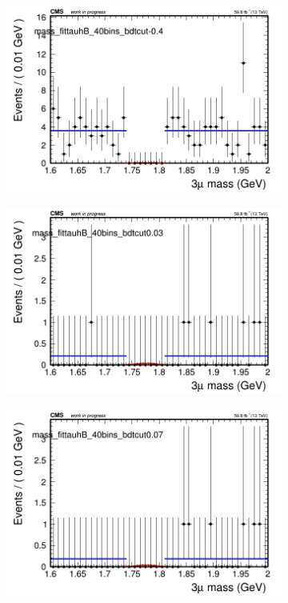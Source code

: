 \begin{figure}[H]
\begin{subfigure}{0.2\textwidth}
        \caption{}
    \end{subfigure}
    \begin{subfigure}{0.2\textwidth}
        \includegraphics[width=\textwidth]{flat_fit/plots/tauhB/massfit_tauhB_40bins_bdtcut-0.4.png}
        \caption{}
    \end{subfigure}
    \begin{subfigure}{0.2\textwidth}
        \includegraphics[width=\textwidth]{flat_fit/plots/tauhB/massfit_tauhB_40bins_bdtcut0.03.png}
        \caption{}
    \end{subfigure}
    \begin{subfigure}{0.2\textwidth}
        \includegraphics[width=\textwidth]{flat_fit/plots/tauhB/massfit_tauhB_40bins_bdtcut0.07.png}

\end{subfigure}
\end{figure}
